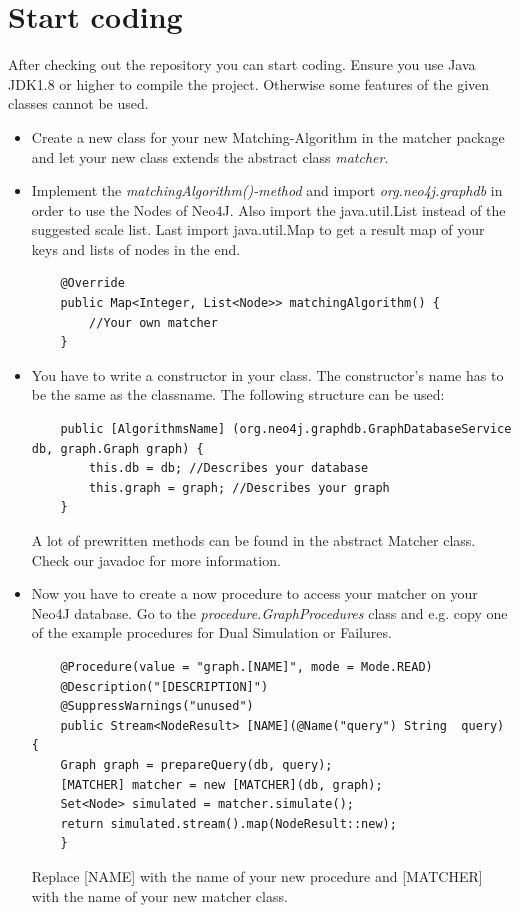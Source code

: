 \section{Start coding}\label{sec:startProgramming}
After checking out the repository you can start coding. Ensure you use Java JDK1.8 or higher to compile the project. Otherwise some features of the given classes cannot be used.
\begin{itemize}
	\item Create a new class for your new Matching-Algorithm in the matcher package and let your new class extends the abstract class \textit{matcher}.
	\item Implement the \textit{matchingAlgorithm()-method} and import \textit{org.neo4j.graphdb} in order to use the Nodes of Neo4J. Also import the java.util.List instead of the suggested scale list. Last import java.util.Map to get a result map of your keys and lists of nodes in the end.
		\lstset{language=Java}
	\begin{lstlisting} 
	@Override
	public Map<Integer, List<Node>> matchingAlgorithm() {
		//Your own matcher
	}
	\end{lstlisting} 
	
	\item You have to write a constructor in your class. The constructor's name has to be the same as the classname. The following structure can be used: 
	\lstset{language=Java}
	\begin{lstlisting}
	public [AlgorithmsName] (org.neo4j.graphdb.GraphDatabaseService db, graph.Graph graph) {
		this.db = db; //Describes your database
		this.graph = graph; //Describes your graph
	}
	\end{lstlisting}
	A lot of prewritten methods can be found in the abstract \glqq Matcher\grqq{} class. Check our javadoc for more information.
	\item Now you have to create a now procedure to access your matcher on your Neo4J database. Go to the \textit{procedure.GraphProcedures} class and e.g. copy one of the example procedures for Dual Simulation or Failures.
	\begin{lstlisting}
	@Procedure(value = "graph.[NAME]", mode = Mode.READ)
	@Description("[DESCRIPTION]")
	@SuppressWarnings("unused")
	public Stream<NodeResult> [NAME](@Name("query") String 	query) {
	Graph graph = prepareQuery(db, query);
	[MATCHER] matcher = new [MATCHER](db, graph);
	Set<Node> simulated = matcher.simulate();
	return simulated.stream().map(NodeResult::new);
	}
	\end{lstlisting} 
	Replace [NAME] with the name of your new procedure and [MATCHER] with the name of your new matcher class.
\end{itemize}

